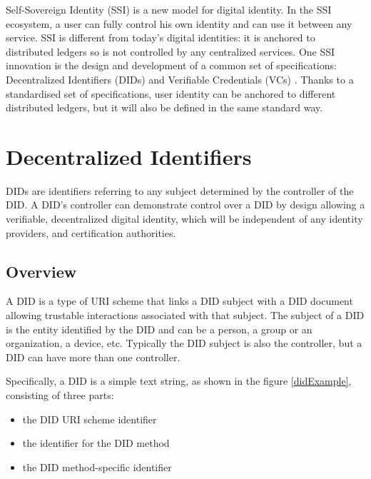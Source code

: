 
Self-Sovereign Identity (SSI) \cite{tobin2016inevitable} is a new model for digital identity. In the SSI ecosystem, a user can fully control his own identity and can use it between any service. SSI is different from today's digital identities: it is anchored to distributed ledgers so is not controlled by any centralized services.
One SSI innovation is the design and development of a common set of specifications: 
Decentralized Identifiers (DIDs) \cite{didW3C} and Verifiable Credentials (VCs) \cite{vcW3C}. 
Thanks to a standardised set of specifications, user identity can be anchored to different distributed ledgers, but it will also be defined in the same standard way.

\section{Decentralized Identifiers}  
DIDs \cite{didW3C} are identifiers referring to any subject determined by the controller of the DID.
A DID's controller can demonstrate control over a DID by design allowing a verifiable, decentralized digital identity, which will be independent of any identity providers, and certification authorities.

\subsection*{Overview}

A DID is a type of URI \cite{berners2005uniform} scheme that links a DID subject with a DID document allowing trustable interactions associated with that subject. The subject of a DID is the entity identified by the DID and can be a person, a group or an organization, a device, etc. Typically the DID subject is also the controller, but a DID can have more than one controller. 

Specifically, a DID is a simple text string, as shown in the figure \ref{didExample}, consisting of three parts: 
\begin{itemize}
    \item the DID URI scheme identifier
    \item the identifier for the DID method
    \item the DID method-specific identifier
\end{itemize}

